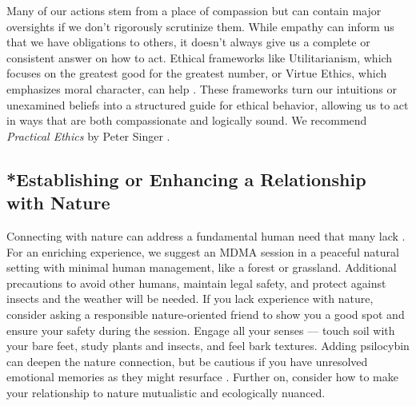 \documentclass[12pt,letterpaper]{article}
\begin{document}
Many of our actions stem from a place of compassion but can contain major oversights if we don't rigorously scrutinize them. While empathy can inform us that we have obligations to others, it doesn't always give us a complete or consistent answer on how to act. Ethical frameworks like Utilitarianism, which focuses on the greatest good for the greatest number, or Virtue Ethics, which emphasizes moral character, can help \cite{IEPUtilitarianism,IEPVirtueEthics}. These frameworks turn our intuitions or unexamined beliefs into a structured guide for ethical behavior, allowing us to act in ways that are both compassionate and logically sound. We recommend \textit{Practical Ethics} by Peter Singer \cite{singerPractical}.  
\subsection{*Establishing or Enhancing a Relationship with Nature}
Connecting with nature can address a fundamental human need that many lack \cite{caoimheGreenspaceOutcomes, baxterNatureRelatedness}. For an enriching experience, we suggest an MDMA session in a peaceful natural setting with minimal human management, like a forest or grassland. Additional precautions to avoid other humans, maintain legal safety, and protect against insects and the weather will be needed. If you lack experience with nature, consider asking a responsible nature-oriented friend to show you a good spot and ensure your safety during the session. Engage all your senses — touch soil with your bare feet, study plants and insects, and feel bark textures. Adding psilocybin can deepen the nature connection, but be cautious if you have unresolved emotional memories as they might resurface \cite{forstmannPsilocybinNature}. Further on, consider how to make your relationship to nature mutualistic and ecologically nuanced.
\end{document}
